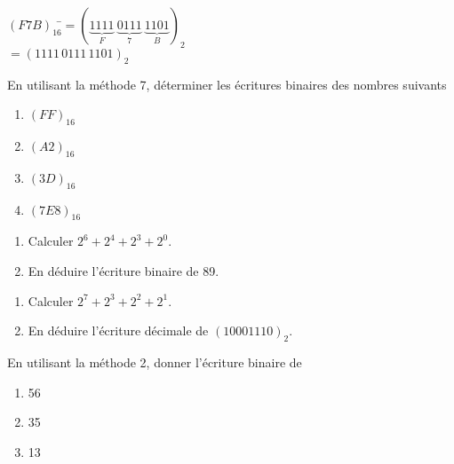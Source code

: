 \documentclass[a4paper,12pt,french]{book}
\begin{document}
\begin{methode}
\begin{tabbing}
$(F7B)_{16}$\=$=\left(\underbrace{1111}_F\ \underbrace{0111}_7\ \underbrace{1101}_B\right)_2$\\
			\>$=\left(1111\,0111\,1101\right)_2$
\end{tabbing}
\end{methode}
\begin{exercice}[]
	En utilisant la méthode 7,  déterminer les écritures binaires des nombres suivants
	\begin{multicols}{2}
		\begin{enumerate}[\bfseries 1.]
			\item 	$(FF)_{16}$
			\item 	$(A2)_{16}$
			\item 	$(3D)_{16}$
			\item 	$(7E8)_{16}$
		\end{enumerate}
	\end{multicols}
\end{exercice}

\exostart




\begin{exercice}
\begin{enumerate}[\bfseries 1.]
	\item 	Calculer $2^6+2^4+2^3+2^0$.
	\item 	En déduire l'écriture binaire de 89.	
\end{enumerate}
\end{exercice}


\begin{exercice}
\begin{enumerate}[\bfseries 1.]
	\item 	Calculer $2^7+2^3+2^2+2^1$.
	\item 	En déduire l'écriture décimale de  $(1000 1110)_2$.	
\end{enumerate}
\end{exercice}


\begin{exercice}[]
En utilisant la méthode 2, donner l'écriture binaire de 
\begin{enumerate}[\bfseries 1.]
	\item 	56
	\item 	35
	\item 	13	
\end{enumerate}
\end{exercice}
\end{document}
